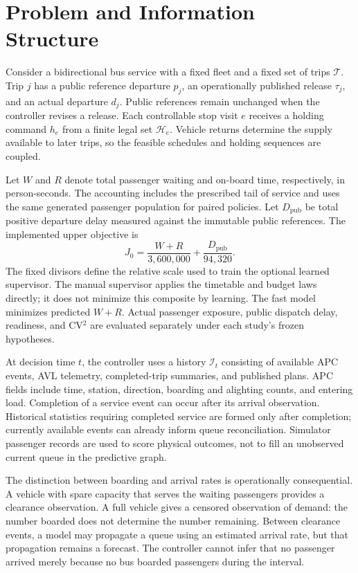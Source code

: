 \section{Problem and Information Structure}
\label{sec:problem}
Consider a bidirectional bus service with a fixed fleet and a fixed set of trips $\mathcal T$. Trip $j$ has a public reference departure $p_j$, an operationally published release $\tau_j$, and an actual departure $d_j$. Public references remain unchanged when the controller revises a release. Each controllable stop visit $e$ receives a holding command $h_e$ from a finite legal set $\mathcal H_e$. Vehicle returns determine the supply available to later trips, so the feasible schedules and holding sequences are coupled.

Let $W$ and $R$ denote total passenger waiting and on-board time, respectively, in person-seconds. The accounting includes the prescribed tail of service and uses the same generated passenger population for paired policies. Let $D_{\mathrm{pub}}$ be total positive departure delay measured against the immutable public references. The implemented upper objective is
\begin{equation}
 J_0=\frac{W+R}{3{,}600{,}000}+\frac{D_{\mathrm{pub}}}{94{,}320}.
 \label{eq:objective}
\end{equation}
The fixed divisors define the relative scale used to train the optional learned supervisor. The manual supervisor applies the timetable and budget laws directly; it does not minimize this composite by learning. The fast model minimizes predicted $W+R$. Actual passenger exposure, public dispatch delay, readiness, and CV$^2$ are evaluated separately under each study's frozen hypotheses.

At decision time $t$, the controller uses a history $\mathcal I_t$ consisting of available APC events, AVL telemetry, completed-trip summaries, and published plans. APC fields include time, station, direction, boarding and alighting counts, and entering load. Completion of a service event can occur after its arrival observation. Historical statistics requiring completed service are formed only after completion; currently available events can already inform queue reconciliation. Simulator passenger records are used to score physical outcomes, not to fill an unobserved current queue in the predictive graph.

The distinction between boarding and arrival rates is operationally consequential. A vehicle with spare capacity that serves the waiting passengers provides a clearance observation. A full vehicle gives a censored observation of demand: the number boarded does not determine the number remaining. Between clearance events, a model may propagate a queue using an estimated arrival rate, but that propagation remains a forecast. The controller cannot infer that no passenger arrived merely because no bus boarded passengers during the interval.

